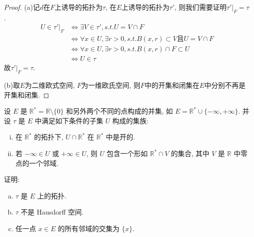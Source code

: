 \begin{proof}
(a)记$d$在$F$上诱导的拓扑为$\tau$, 在$E$上诱导的拓扑为$\tau'$, 则我们需要证明$\tau'|_F=\tau$.
\[\begin{split}
U\in\tau'|_F&\Leftrightarrow\exists V\in\tau',s.t.U=V\cap F\\
&\Leftrightarrow\forall x\in U,\exists r>0,s.t.B(x,r)\subset V\mbox{且}U=V\cap F\\
&\Leftrightarrow\forall x\in U,\exists r>0,s.t.B(x,r)\cap F\subset U\\
&\Leftrightarrow U\in\tau
\end{split}\]
故$\tau'|_F=\tau$.

(b)取$E$为二维欧式空间, $F$为一维欧氏空间, 则$F$中的开集和闭集在$E$中分别不再是开集和闭集.
\end{proof}

\begin{exercise}
设 $E$ 是 $\mathbb{R}^*=\mathbb{R}\setminus\{0\}$ 和另外两个不同的点构成的并集,
如 $E=\mathbb{R}^*\cup\{-\infty,+\infty\}$. 并设 $\tau$ 是 $E$ 中满足如下条件的子集 $U$ 构成的集族:
\begin{enumerate}[(i)]
    \item 在 $\mathbb{R}^*$ 的拓扑下, $U\cap\mathbb{R}^*$ 在 $\mathbb{R}^*$ 中是开的.
    \item 若 $-\infty\in U$ 或 $+\infty\in U$, 则 $U$ 包含一个形如 $\mathbb{R}^*\cap V$ 的集合, 其中 $V$ 是 $\mathbb{R}$ 中零点的一个邻域.
\end{enumerate}
证明:
\begin{enumerate}[(a)]
    \item $\tau$ 是 $E$ 上的拓扑.
    \item $\tau$ 不是 Hausdorff 空间.
    \item 任一点 $x\in E$ 的所有邻域的交集为 $\{x\}$.
\end{enumerate}
\end{exercise}


